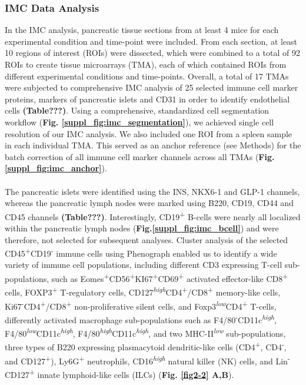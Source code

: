 \subsubsection{IMC Data Analysis}
In the IMC analysis, pancreatic tissue sections from at least 4 mice for each experimental condition and time-point were included. From each section, at least 10 regions of interest (ROIs) were dissected, which were combined to a total of 92 ROIs to create tissue microarrays (TMA), each of which contained ROIs from different experimental conditions and time-points. Overall, a total of 17 TMAs were subjected to comprehensive IMC analysis of 25 selected immune cell marker proteins, markers of pancreatic islets and CD31 in order to identify endothelial cells \textbf{(Table???)}. Using a comprehensive, standardized cell segmentation workflow (\textbf{Fig. \ref{suppl_fig:imc_segmentation}}), we achieved single cell resolution of our IMC analysis. We also included one ROI from a spleen sample in each individual TMA. This served as an anchor reference (see Methods) for the batch correction of all immune cell marker channels across all TMAs (\textbf{Fig.\ref{suppl_fig:imc_anchor}}).\\\\
The pancreatic islets were identified using the INS, NKX6-1 and GLP-1 channels, whereas the pancreatic lymph nodes were marked using B220, CD19, CD44 and CD45 channels \textbf{(Table???)}. Interestingly, CD19\textsuperscript{+} B-cells were nearly all localized within the pancreatic lymph nodes (\textbf{Fig.\ref{suppl_fig:imc_bcell}}) and were therefore, not selected for subsequent analyses. Cluster analysis of the selected CD45\textsuperscript{+}CD19\textsuperscript{-} immune cells using Phenograph enabled us to identify a wide variety of immune cell populations, including different CD3 expressing T-cell sub-populations, such as Eomes\textsuperscript{+}CD56\textsuperscript{+}KI67\textsuperscript{+}CD69\textsuperscript{+} activated effector-like CD8\textsuperscript{+} cells, FOXP3\textsuperscript{+} T-regulatory cells, CD127\textsuperscript{\textit{high}}CD4\textsuperscript{+}/CD8\textsuperscript{+} memory-like cells, Ki67\textsuperscript{-}CD4\textsuperscript{+}/CD8\textsuperscript{+} non-proliferative silent cells, and Foxp3\textsuperscript{\textit{low}}CD4\textsuperscript{+} T-cells, differently activated macrophage sub-populations such as F4/80\textsuperscript{-}CD11c\textsuperscript{\textit{high}}, F4/80\textsuperscript{\textit{low}}CD11c\textsuperscript{\textit{high}}, F4/80\textsuperscript{\textit{high}}CD11c\textsuperscript{\textit{high}}, and two MHC-II\textsuperscript{\textit{low}} sub-populations, three types of B220 expressing plasmacytoid dendritic-like cells (CD4\textsuperscript{+}, CD4\textsuperscript{-}, and CD127\textsuperscript{+}), Ly6G\textsuperscript{+} neutrophils, CD16\textsuperscript{\textit{high}} natural killer (NK) cells, and Lin\textsuperscript{-}CD127\textsuperscript{+} innate lymphoid-like cells (ILCs) (\textbf{Fig. \ref{fig2-2} A,B}).\\\\
